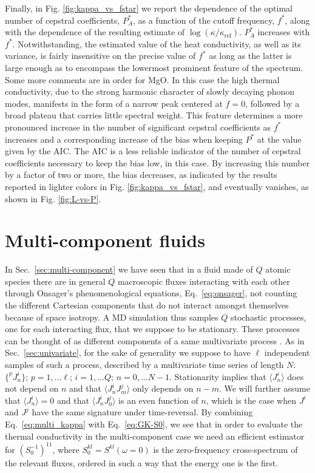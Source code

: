 Finally, in Fig. \ref{fig:kappa_vs_fstar} we report the dependence of the optimal number of cepstral coefficients, $P_A^*$, as a function of the cutoff frequency, $f^*$, along with the dependence of the resulting estimate of $\log(\kappa/\kappa_{\mathrm{ref}})$. $P_A^*$ increases with $f^*$. Notwithstanding, the estimated value of the heat conductivity, as well as its variance, is fairly insensitive on the precise value of $f^*$ as long as the latter is large enough as to encompass the lowermost prominent feature of the spectrum. Some more comments are in order for MgO. In this case the high thermal conductivity, due to the strong harmonic character of slowly decaying phonon modes, manifests in the form of a narrow peak centered at $f=0$, followed by a broad plateau that carries little spectral weight. This feature determines a more pronounced increase in the number of significant cepstral coefficients as $f^*$ increases and a corresponding increase of the bias when keeping $P^*$ at the value given by the AIC. The AIC is a less reliable indicator of the number of cepstral coefficients necessary to keep the bias low, in this case. By increasing this number by a factor of two or more, the bias decreases, as indicated by the results reported in lighter colors in Fig. \ref{fig:kappa_vs_fstar}, and eventually vanishes, as shown in Fig. \ref{fig:L-vs-P}.

\section{Multi-component fluids}
In Sec.~\ref{sec:multi-component} we have seen that in a fluid made of $Q$ atomic species there are in general $Q$ macroscopic fluxes interacting with each other through Onsager's phenomenological equations, Eq.~\eqref{eq:onsager}, not counting the different Cartesian components that do not interact amongst themselves because of space isotropy. A MD simulation thus samples $Q$ stochastic processes, one for each interacting flux, that we suppose to be stationary. These processes can be thought of as different components of a same multivariate process \citep{Bertossa2018}. As in Sec.~\ref{sec:univariate}, for the sake of generality we suppose to have $\ell$ independent samples of such a process, described by a multivariate time series of length $N$: $\{ ^{p\!}{J}^i_n \}$; $p=1,\dots \ell$; $i=1,\dots Q$; $n=0,\dots N-1$. Stationarity implies that $\langle {J}^i_n\rangle $ does not depend on $n$ and that $\langle {J}^i_n {J}^j_m \rangle$ only depends on $n-m$. We will further assume that $\langle {J}^i_n\rangle =0 $ and that $\langle {J}^i_n {J}^j_0 \rangle$ is an even function of $n$, which is the case when ${J}^i$ and ${J}^j$ have the same signature under time-reversal. By combining Eq.~\eqref{eq:multi_kappa} with Eq.~\eqref{eq:GK-S0}, we see that in order to evaluate the thermal conductivity in the multi-component case we need an efficient estimator for $\left ( S^{-1}_0\right )^{11}$, where $S^{kl}_0=S^{kl}(\omega=0)$ is the zero-frequency cross-spectrum of the relevant fluxes, ordered in  such a way that the energy one is the first.

